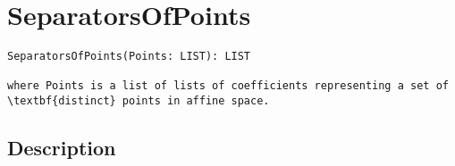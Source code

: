 \documentclass[a4paper]{mybook}
\newenvironment{command}{}{} %
\begin{document}
\section{SeparatorsOfPoints}
\label{SeparatorsOfPoints}
\begin{command} %


\begin{Verbatim}[label=syntax, rulecolor=\color{MidnightBlue},
frame=single]
SeparatorsOfPoints(Points: LIST): LIST

where Points is a list of lists of coefficients representing a set of
\textbf{distinct} points in affine space.
\end{Verbatim}


\subsection*{Description}


\end{command}
\end{document}

